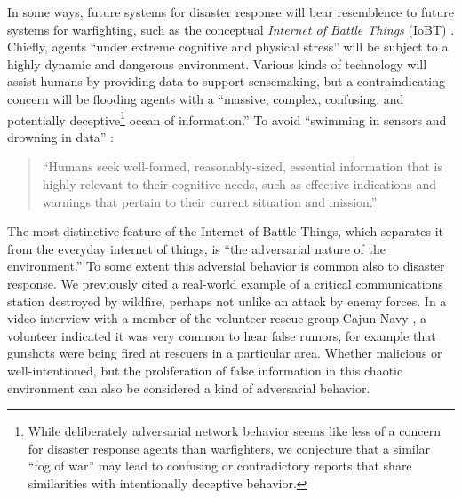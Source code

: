 \documentclass[]             %
{NASA}                       %
\theoremstyle{definition}
\begin{document}
In some ways, future systems for disaster response will bear
resemblence to future systems for warfighting, such as the conceptual
\emph{Internet of Battle Things} (IoBT) \cite{2016:iobt}. Chiefly,
agents ``under extreme cognitive and physical stress'' will be subject
to a highly dynamic and dangerous environment. Various kinds of
technology will assist humans by providing data to support
sensemaking, but a contraindicating concern will be flooding agents with a
``massive, complex, confusing, and potentially
deceptive\footnote{While deliberately adversarial network behavior
seems like less of a concern for disaster response agents than
warfighters, we conjecture that a similar ``fog of war'' may
lead to confusing or contradictory reports that share similarities
with intentionally deceptive behavior.} ocean of information.'' To
avoid ``swimming in sensors and drowning in data''
\cite{2010:magnuson}:
\begin{quote}
``Humans seek well-formed, reasonably-sized, essential information
  that is highly relevant to their cognitive needs, such as effective
  indications and warnings that pertain to their current situation and
  mission.'' \cite{2016:iobt}
\end{quote}
The most distinctive feature of the Internet of Battle Things, which
separates it from the everyday internet of things, is ``the
adversarial nature of the environment.'' To some extent this adversial
behavior is common also to disaster response. We previously cited a
real-world example of a critical communications station destroyed by
wildfire, perhaps not unlike an attack by enemy forces. In a video
interview with a member of the volunteer rescue group Cajun Navy
\citationneeded, a volunteer indicated it was very common to hear
false rumors, for example that gunshots were being fired at rescuers
in a particular area. Whether malicious or well-intentioned, but the
proliferation of false information in this chaotic environment can
also be considered a kind of adversarial behavior.
\end{document}
